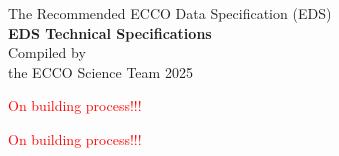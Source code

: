 \pagebreak

\begin{center}
    \vspace*{2cm}
    {\Large The Recommended ECCO Data Specification (EDS)}\\[2cm]
    {\LARGE \textbf{EDS Technical Specifications}}\\[2cm]
    {\large Compiled by\\the ECCO Science Team 2025}\\[2cm]
\end{center}

\begin{center}
    \textcolor{red}{\Large{On building process!!!}}
\end{center}

\newpage

\begin{center}
    \textcolor{red}{\Large{On building process!!!}}
\end{center}



